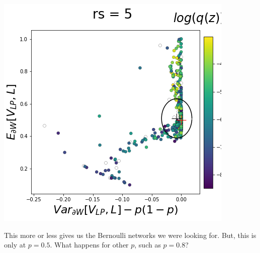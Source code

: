 \documentclass[11pt]{article}
\begin{document}
\begin{center}
\includegraphics[scale=0.33]{figs/T_x_SC_pvar_reduced_c=0_p=50_rs=5.png}
\end{center}

This more or less gives us the Bernoulli networks we were looking for.   But, this is only at $p = 0.5$.  What happens for other $p$, such as $p=0.8$?
\end{document}
